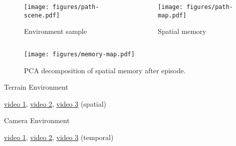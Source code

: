 \begin{frame}
    \begin{columns}
        \begin{column}{0.55\textwidth}
            \begin{figure}
                \centering
                \texttt{[image: figures/path-scene.pdf]}
                \par Environment sample
            \end{figure}
        \end{column}
        \begin{column}{0.5\textwidth}
            \begin{figure}
                \centering
                \texttt{[image: figures/path-map.pdf]}
                \par Spatial memory 
            \end{figure}
        \end{column}
    \end{columns}
\end{frame}

\begin{frame}
    \begin{figure}
        \centering
        \texttt{[image: figures/memory-map.pdf]}
        \par PCA decomposition of spatial memory after episode.
    \end{figure}
\end{frame}

\begin{frame}
    \begin{table}
        \centering
        Terrain Environment\par\vspace{0.5em}
        
    \end{table}

    \centering \href{run:videos/terrain/map/0.gif}{video 1}, \href{run:videos/terrain/map/0.gif}{video 2}, \href{run:videos/terrain/map/2.gif}{video 3} (spatial)
\end{frame}

\begin{frame}
    \begin{table}
        \centering
        Camera Environment\par\vspace{0.5em}
        
    \end{table}

    \centering \href{run:videos/camera/lstm/0.gif}{video 1}, \href{run:videos/camera/lstm/0.gif}{video 2}, \href{run:videos/camera/lstm/2.gif}{video 3} (temporal)
\end{frame}

